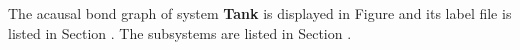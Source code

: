 

   The acausal bond graph of system \textbf{Tank} is
   displayed in Figure  and its label
   file is listed in Section .
   The subsystems are listed in Section .
